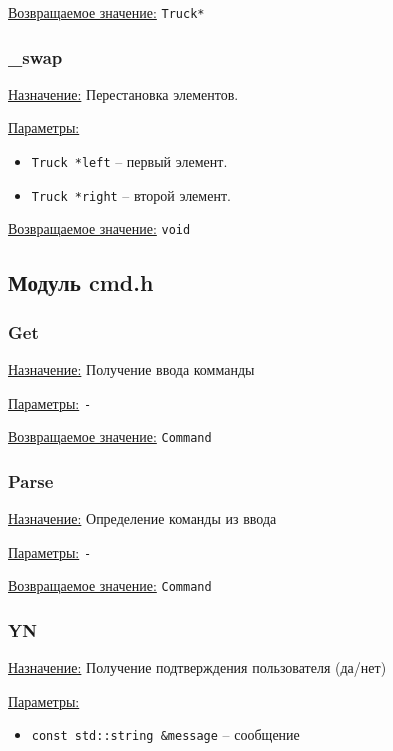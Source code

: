 \underline{Возвращаемое значение:} \verb|Truck*|


\subsubsection*{\_swap}

\underline{Назначение:} Перестановка элементов.

\underline{Параметры:} 

\begin{itemize}
    \item \verb|Truck *left| -- первый элемент.
    \item \verb|Truck *right| -- второй элемент.
\end{itemize}

\underline{Возвращаемое значение:} \verb|void|


\subsection*{Модуль cmd.h}


\subsubsection*{Get}

\underline{Назначение:} Получение ввода комманды

\underline{Параметры:} \verb|-|

\underline{Возвращаемое значение:} \verb|Command|


\subsubsection*{Parse}

\underline{Назначение:} Определение команды из ввода

\underline{Параметры:} \verb|-|

\underline{Возвращаемое значение:} \verb|Command|


\subsubsection*{YN}

\underline{Назначение:} Получение подтверждения пользователя (да/нет)

\underline{Параметры:} 

\begin{itemize}
    \item \verb|const std::string &message| -- сообщение
\end{itemize}

